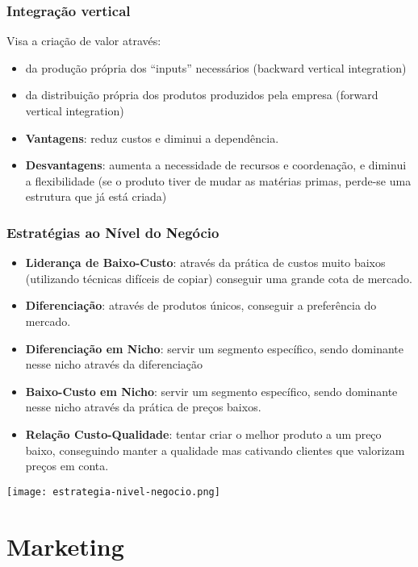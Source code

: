 \documentclass[11pt]{article}
\begin{document}
\subsubsection*{Integração vertical}

Visa a criação de valor através:
\begin{itemize}[topsep=0pt]
    \item da produção própria dos “inputs” necessários (backward vertical integration)
    \item da distribuição própria dos produtos produzidos pela empresa (forward
          vertical integration)
    \item \textbf{Vantagens}: reduz custos e diminui a dependência.
    \item \textbf{Desvantagens}: aumenta a necessidade de recursos e coordenação, e diminui a flexibilidade (se o produto tiver de mudar as matérias primas, perde-se uma estrutura que já está criada)
\end{itemize}

\subsubsection{Estratégias ao Nível do Negócio}

\begin{itemize}
    \item \textbf{Liderança de Baixo-Custo}: através da prática de custos muito baixos (utilizando técnicas difíceis de copiar) conseguir uma grande cota de mercado.
    \item \textbf{Diferenciação}: através de produtos únicos, conseguir a preferência do mercado.
    \item \textbf{Diferenciação em Nicho}: servir um segmento específico, sendo dominante nesse nicho através da diferenciação
    \item \textbf{Baixo-Custo em Nicho}: servir um segmento específico, sendo dominante nesse nicho através da prática de preços baixos.
    \item \textbf{Relação Custo-Qualidade}: tentar criar o melhor produto a um preço baixo, conseguindo manter a qualidade mas cativando clientes que valorizam preços em conta.
\end{itemize}

\texttt{[image: estrategia-nivel-negocio.png]}

\newpage

\section{Marketing}
\end{document}

